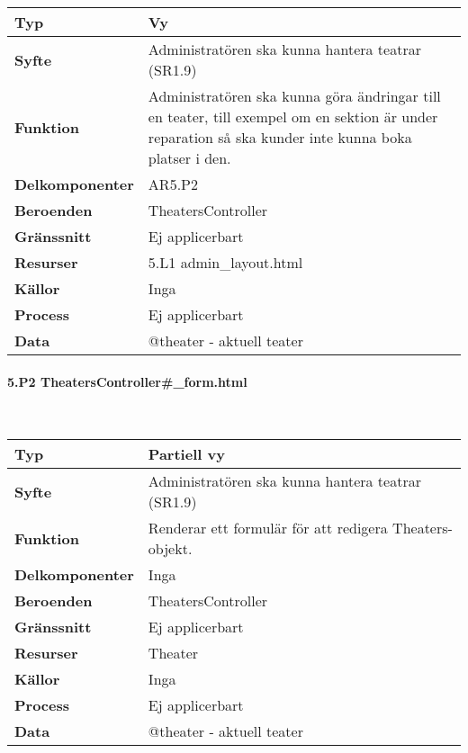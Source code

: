 \documentclass[a4paper, twoside, 11pt, titlepage]{article}
\begin{document}
			\begin {table} [ht] \begin{tabular} {  p{3.5cm} p{11.6cm} }
				\hline
				{\sffamily\textbf{Typ}} & {Vy} \\
				\hline
				{\sffamily\textbf{Syfte}} & {Administratören ska kunna hantera teatrar (SR1.9)} \\
				\hline
				{\sffamily\textbf{Funktion}} & {Administratören ska kunna göra ändringar till en teater, till exempel om en sektion är under reparation så ska kunder inte kunna boka platser i den.} \\
				\hline
				{\sffamily\textbf{Delkomponenter}} & {AR5.P2} \\
				\hline
				{\sffamily\textbf{Beroenden}} & {TheatersController} \\
				\hline
				{\sffamily\textbf{Gränssnitt}} & {Ej applicerbart} \\
				\hline
				{\sffamily\textbf{Resurser}} & {5.L1 admin\_layout.html} \\
				\hline
				{\sffamily\textbf{Källor}} & {Inga} \\
				\hline
				{\sffamily\textbf{Process}} & {Ej applicerbart} \\
				\hline
				{\sffamily\textbf{Data}} & {@theater - aktuell teater} \\
				\hline
			\end{tabular} \end{table} \FloatBarrier


			\paragraph{5.P2 TheatersController\#\_form.html}\

			\begin {table} [ht] \begin{tabular} {  p{3.5cm} p{11.6cm} }
				\hline
				{\sffamily\textbf{Typ}} & {Partiell vy} \\
				\hline
				{\sffamily\textbf{Syfte}} & {Administratören ska kunna hantera teatrar (SR1.9)} \\
				\hline
				{\sffamily\textbf{Funktion}} & {Renderar ett formulär för att redigera Theaters-objekt.} \\
				\hline
				{\sffamily\textbf{Delkomponenter}} & {Inga} \\
				\hline
				{\sffamily\textbf{Beroenden}} & {TheatersController} \\
				\hline
				{\sffamily\textbf{Gränssnitt}} & {Ej applicerbart} \\
				\hline
				{\sffamily\textbf{Resurser}} & {Theater} \\
				\hline
				{\sffamily\textbf{Källor}} & {Inga} \\
				\hline
				{\sffamily\textbf{Process}} & {Ej applicerbart} \\
				\hline
				{\sffamily\textbf{Data}} & {@theater - aktuell teater} \\
				\hline
			\end{tabular} \end{table} \FloatBarrier
\end{document}
